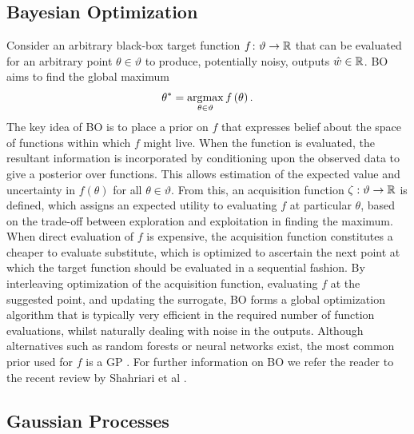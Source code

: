 \vspace{10pt}
\subsection{Bayesian Optimization}
\label{sec:BO}
Consider an arbitrary black-box target function $f \colon \vartheta \rightarrow \mathbb{R}$ that can be evaluated for an arbitrary point $\theta \in \vartheta$ to produce, potentially noisy, outputs $\hat{w} \in \mathbb{R}$.  BO \citep{jones1998efficient,osborne2009gaussian} aims to find the global maximum
\begin{align}
\label{eq:funcMax}
\theta^* = \operatorname*{arg\,\!max}_{\theta \in \vartheta} f\left(\theta\right).
\end{align}
The key idea of BO is to place a prior on $f$ that expresses belief about the space of functions within which $f$ might live.  When the function is evaluated, the resultant information is incorporated by conditioning upon the observed data to give a posterior over functions.  
This allows estimation of the expected value and uncertainty in $f\left(\theta\right)$ for all $\theta \in \vartheta$.  
From this, an acquisition function $\zeta : \vartheta \rightarrow \mathbb{R}$ is defined, which assigns an expected utility to evaluating $f$ at particular $\theta$, based on the trade-off between exploration and exploitation in finding the maximum.  When direct evaluation of $f$ is expensive, the acquisition function constitutes a cheaper to evaluate substitute, which is optimized to ascertain the next point at which the target function should be evaluated in a sequential fashion.  By interleaving optimization of the acquisition function, evaluating $f$ at the suggested point, and updating the surrogate, BO forms a global optimization algorithm that is typically very efficient in the required number of function evaluations, whilst naturally dealing with noise in the outputs.  Although alternatives such as random forests \citep{bergstra2011algorithms,hutter2011sequential} or neural networks \citep{snoek2015scalable} exist, the most common prior used for $f$ is a GP \citep{rasmussen2006gaussian}.  
For further information on BO we refer the reader to the recent review by Shahriari et al \cite{shahriari2016taking}.

\subsection{Gaussian Processes}
\label{sec:GPs}

